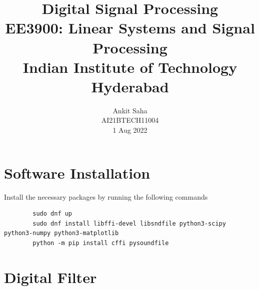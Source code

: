 \documentclass[journal,12pt,twocolumn]{IEEEtran}
\title{Digital Signal Processing \\ \Large EE3900: Linear Systems and Signal Processing \\ \large Indian Institute of Technology Hyderabad}
\author{Ankit Saha \\ \normalsize AI21BTECH11004 \\ \vspace*{20pt} \normalsize 1 Aug 2022}
\numberwithin{equation}{section}
\begin{document}
	\maketitle
	
	\section{Software Installation}
	Install the necessary packages by running the following commands
	\begin{lstlisting}
		sudo dnf up
		sudo dnf install libffi-devel libsndfile python3-scipy  python3-numpy python3-matplotlib 
		python -m pip install cffi pysoundfile 
	\end{lstlisting}

	\section{Digital Filter}
\end{document}
